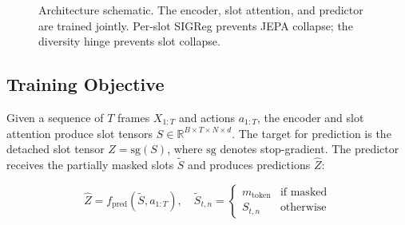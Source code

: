 \documentclass[12pt]{article}
\begin{document}
\begin{figure}[t]
\centering
\setlength{\fboxsep}{10pt}
\caption{Architecture schematic. The encoder, slot attention, and predictor are trained jointly. Per-slot SIGReg prevents JEPA collapse; the diversity hinge prevents slot collapse.}
\label{fig:arch}
\end{figure}

\subsection{Training Objective}

Given a sequence of $T$ frames $X_{1:T}$ and actions $a_{1:T}$, the encoder and slot attention produce slot tensors $S \in \mathbb{R}^{B \times T \times N \times d}$. The target for prediction is the detached slot tensor $Z = \text{sg}(S)$, where $\text{sg}$ denotes stop-gradient. The predictor receives the partially masked slots $\tilde{S}$ and produces predictions $\hat{Z}$:

\begin{equation}
\hat{Z} = f_{\text{pred}}(\tilde{S}, a_{1:T}), \quad
\tilde{S}_{t,n} = \begin{cases}
m_{\text{token}} & \text{if masked}\\
S_{t,n} & \text{otherwise}
\end{cases}
\end{equation}
\end{document}
